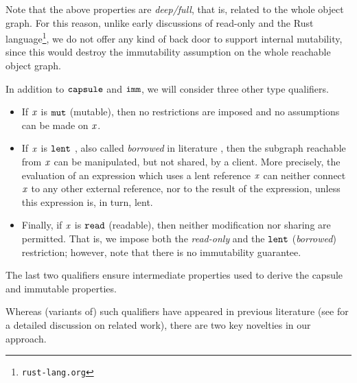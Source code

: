{Note that the above properties are \emph{deep/full}, that is, related to the whole object graph.} {For this reason,} unlike early
 discussions of read-only
  \cite{Boyland06} and the Rust language\footnote{\texttt{rust-lang.org}}, we do not offer any kind of back door to support internal mutability, since this would destroy the immutability assumption on the whole reachable object graph.
  
{In addition to $\texttt{capsule}$ and $\texttt{imm}$, we will consider three other type qualifiers.
\begin{itemize}
\item If $\mathit{x}$ is $\texttt{mut}$ (mutable), then no restrictions are imposed and no assumptions can be made on $\mathit{x}$.  
\item If $\mathit{x}$ is $\texttt{lent}$ \cite{ServettoZucca15,GianniniEtAl16}, also called \emph{borrowed} in literature \cite{Boyland01,NadenEtAl12}, then the subgraph reachable from $\mathit{x}$ can be manipulated, but not shared, by a client. More precisely, the evaluation of an expression which uses a lent reference $\mathit{x}$ can neither connect $\mathit{x}$ to any other external reference, nor to the result of the expression, unless this expression is, in turn, lent.
\item Finally, if $\mathit{x}$ is $\texttt{read}$ (readable), then  neither modification nor sharing are permitted. That is, we impose both the \emph{read-only} and the $\texttt{lent}$ {(\emph{borrowed})} restriction; however, note that there is no immutability guarantee.
\end{itemize}}
  The
last two qualifiers
ensure intermediate properties used to derive the  capsule and immutable properties. 


Whereas (variants of) such qualifiers have appeared in previous literature (see  
for a detailed discussion on related work), there are two key novelties in our approach. 


